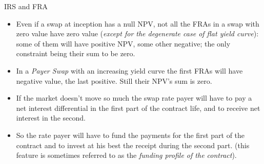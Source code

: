 \documentclass{beamer}
\begin{document}
\begin{frame}{IRS and FRA}
	\begin{itemize}
		\item<1-> Even if a swap at inception has a null NPV, not all the FRAs in a swap with zero value have zero value (\emph{except for the degenerate case of flat yield curve}): some of them will have positive NPV, some other negative; the only constraint being their sum to be zero.
		\item<2-> In a \emph{Payer Swap} with an increasing yield curve the first FRAs will have negative value, the last positive. Still their NPV's sum is zero.
		\item<3-> If the market doesn't move so much the swap rate payer will have to pay a net interest differential in the first part of the contract life, and to receive net interest in the second.
		\item<4-> So the rate payer will have to fund the payments for the first part of the contract and to invest at his best the receipt during the second part. (this feature is sometimes referred to as the \emph{funding profile of the contract}).
	\end{itemize}
\end{frame}
\end{document}

